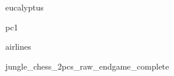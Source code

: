 \documentclass[sigconf,nonacm,screen]{acmart}
\begin{document}


  
        \begin{figure}[!ht]
            \centering
            
            \caption{eucalyptus}
        \end{figure}  
    
  
        \begin{figure}[!ht]
            \centering
            
            \caption{pc1}
        \end{figure}  
    
  
        \begin{figure}[!ht]
            \centering
            
            \caption{airlines}
        \end{figure}  
    
  
        \begin{figure}[!ht]
            \centering
            
            \caption{jungle\_chess\_2pcs\_raw\_endgame\_complete}
        \end{figure}  
    
\end{document}
